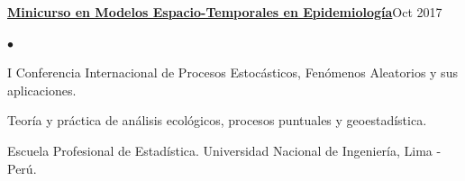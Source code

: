 \documentclass[margin,line]{res}
\newenvironment{list2}{
	\begin{list}{$\bullet$}{%
			\setlength{\itemsep}{0in}
			\setlength{\parsep}{0in} \setlength{\parskip}{0in}
			\setlength{\topsep}{0in} \setlength{\partopsep}{0in}
			\setlength{\leftmargin}{0.2in}}}{\end{list}}
\begin{document}
\begin{resume}
		{\bf \href{http://www.cipefa2017.uni.edu.pe/}{Minicurso en Modelos Espacio-Temporales en Epidemiología}}\hfill {Oct 2017}\\
		\vspace*{-.1in}%
		\begin{list2} %
			\item I Conferencia Internacional de Procesos Estocásticos, Fenómenos Aleatorios y sus aplicaciones.%
			\item Teoría y práctica de análisis ecológicos, procesos puntuales y geoestadística.
			\item Escuela Profesional de Estadística. Universidad Nacional de Ingeniería, Lima - Perú.%
		\end{list2}
		
% 
		

\end{resume}
\end{document}
